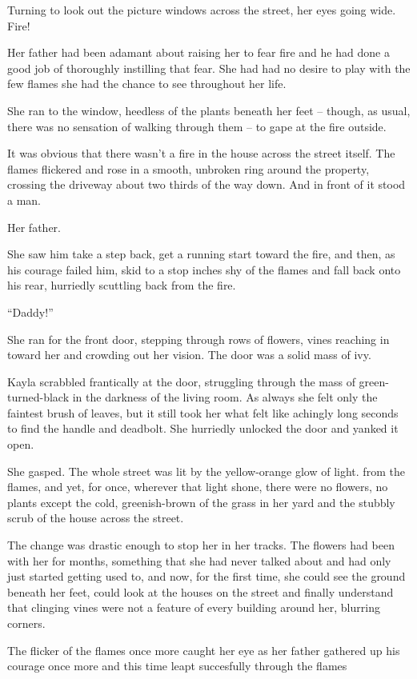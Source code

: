 Turning to look out the picture windows across the street, her eyes going wide.  Fire!

Her father had been adamant about raising her to fear fire and he had done a good job of thoroughly instilling that fear.  She had had no desire to play with the few flames she had the chance to see throughout her life.

She ran to the window, heedless of the plants beneath her feet -- though, as usual, there was no sensation of walking through them -- to gape at the fire outside.

It was obvious that there wasn't a fire in the house across the street itself.  The flames flickered and rose in a smooth, unbroken ring around the property, crossing the driveway about two thirds of the way down.  And in front of it stood a man.

Her father.

She saw him take a step back, get a running start toward the fire, and then, as his courage failed him, skid to a stop inches shy of the flames and fall back onto his rear, hurriedly scuttling back from the fire.

``Daddy!''

She ran for the front door, stepping through rows of flowers, vines reaching in toward her and crowding out her vision.  The door was a solid mass of ivy.

Kayla scrabbled frantically at the door, struggling through the mass of green-turned-black in the darkness of the living room.  As always she felt only the faintest brush of leaves, but it still took her what felt like achingly long seconds to find the handle and deadbolt.  She hurriedly unlocked the door and yanked it open.

She gasped.  The whole street was lit by the yellow-orange glow of light. from the flames, and yet, for once, wherever that light shone, there were no flowers, no plants except the cold, greenish-brown of the grass in her yard and the stubbly scrub of the house across the street.

The change was drastic enough to stop her in her tracks.  The flowers had been with her for months, something that she had never talked about and had only just started getting used to, and now, for the first time, she could see the ground beneath her feet, could look at the houses on the street and finally understand that clinging vines were not a feature of every building around her, blurring corners.

The flicker of the flames once more caught her eye as her father gathered up his courage once more and this time leapt succesfully through the flames
